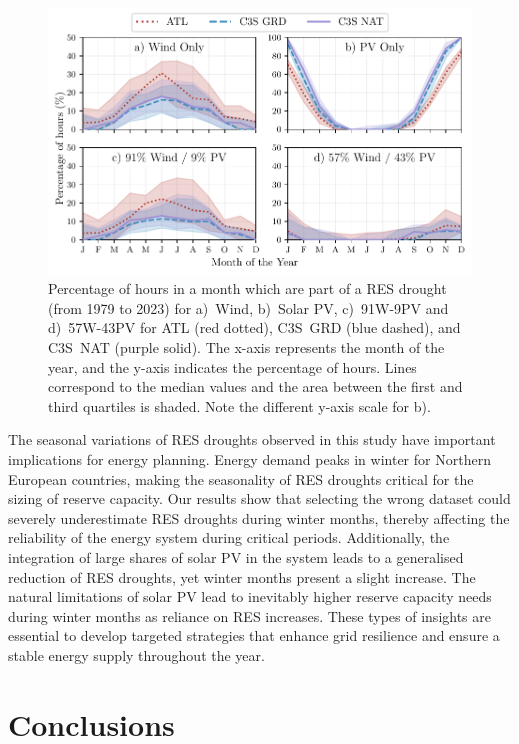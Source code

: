 \documentclass[preprint, 12pt]{elsarticle}
\begin{document}
\begin{figure}[!ht]
	\centering
	\includegraphics[width=\textwidth]{droughts_seasonality.pdf}
	\caption{Percentage of hours in a month which are part of a RES drought (from 1979 to 2023) for a)~Wind, b)~Solar PV, c)~91W-9PV and d)~57W-43PV for ATL (red dotted), C3S~GRD (blue dashed), and C3S~NAT (purple solid). The x-axis represents the month of the year, and the y-axis indicates the percentage of hours. Lines correspond to the median values and the area between the first and third quartiles is shaded. Note the different y-axis scale for b).}
	\label{fig:res_droughts_seasonality}
\end{figure}

The seasonal variations of RES droughts observed in this study have important implications for energy planning. Energy demand peaks in winter for Northern European countries, making the seasonality of RES droughts critical for the sizing of reserve capacity. Our results show that selecting the wrong dataset could severely underestimate RES droughts during winter months, thereby affecting the reliability of the energy system during critical periods. Additionally, the integration of large shares of solar PV in the system leads to a generalised reduction of RES droughts, yet winter months present a slight increase. The natural limitations of solar PV lead to inevitably higher reserve capacity needs during winter months as reliance on RES increases. These types of insights are essential to develop targeted strategies that enhance grid resilience and ensure a stable energy supply throughout the year.


\section{Conclusions}
\label{sec:conclusions}
\end{document}
